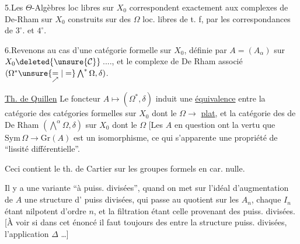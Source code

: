 5.\quad Les $\Theta$-Algèbres loc libres  sur $X_0$ correspondent exactement aux complexes de De-Rham sur $X_0$ construits sur des $\Omega$ loc. libres de t. f, par les correspondances de $3^\circ$. et $4^\circ$.

6.\quad Revenons au cas d'une catégorie formelle sur $X_0$, définie par $A=(A_\alpha)$ sur $X_0\deleted{\unsure{\mathcal C}}$\,...., et le complexe de De Rham associé $(\Omega^*\unsure{\underset{\nearrow}{=}|=}\bigwedge^*\Omega,\delta)$.

\uline{Th. de Quillen}  Le foncteur $A\longmapsto(\Omega^*,\delta)$ induit une \uline{équivalence} entre la catégorie des catégories formelles  sur $X_0$ dont le $\Omega\to$ \uline{plat}, et la catégorie des  de De Rham $(\bigwedge^\alpha\Omega,\delta)$ sur $X_0$ dont le $\Omega$   [Les $A$ en question ont la vertu que $\mathrm{Sym}\,\Omega\longrightarrow\mathrm{Gr}(A)$ est un isomorphisme, ce qui s'apparente  une propriété de ``lissité différentielle''.

Ceci contient le th. de Cartier sur les groupes formels en car. nulle.

Il y a une variante ``à puiss. divisées'', quand on met sur l'idéal d'augmentation de $A$  une structure d' puiss divisées, qui passe au quotient sur les $A_n$, chaque $I_n$ étant nilpotent d'ordre $n$, et la filtration étant celle provenant des puiss. divisées. [À voir si dans cet énoncé il faut toujours des  entre la structure  puiss. divisées,  l'application $\Delta$ \ldots]

